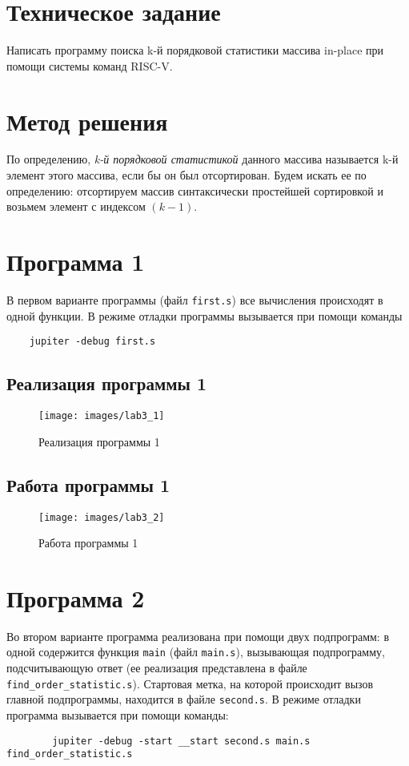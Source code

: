     \section{Техническое задание}

    Написать программу поиска k-й порядковой статистики массива in-place при помощи системы команд RISC-V.

    \section{Метод решения}

    По определению, \textit{k-й порядковой статистикой} данного массива называется k-й элемент этого массива, если бы
    он был отсортирован.
    Будем искать ее по определению: отсортируем массив синтаксически простейшей сортировкой и возьмем элемент с индексом $(k - 1)$.

    \section{Программа 1}
    В первом варианте программы (файл \verb|first.s|) все вычисления происходят в одной функции.
    В режиме отладки программы вызывается при помощи команды
    \begin{verbatim}
    jupiter -debug first.s
    \end{verbatim}
    \subsection{Реализация программы 1}
    \begin{figure}[H]
        \centering
        \texttt{[image: images/lab3\_1]}
        \caption{Реализация программы 1}
        \label{fig:code_1}
    \end{figure}

    \subsection{Работа программы 1}
    \begin{figure}[H]
        \centering
        \texttt{[image: images/lab3\_2]}
        \caption{Работа программы 1}
        \label{fig:debug_1}
    \end{figure}

    \section{Программа 2}
    Во втором варианте программа реализована при помощи двух подпрограмм: в одной содержится функция \verb|main| (файл \verb|main.s|), вызывающая подпрограмму, подсчитывающую ответ (ее реализация представлена в файле \verb|find_order_statistic.s|).
    Стартовая метка, на которой происходит вызов главной подпрограммы, находится в файле \verb|second.s|.
    В режиме отладки программа вызывается при помощи команды:
    \begin{verbatim}
        jupiter -debug -start __start second.s main.s find_order_statistic.s
    \end{verbatim}
